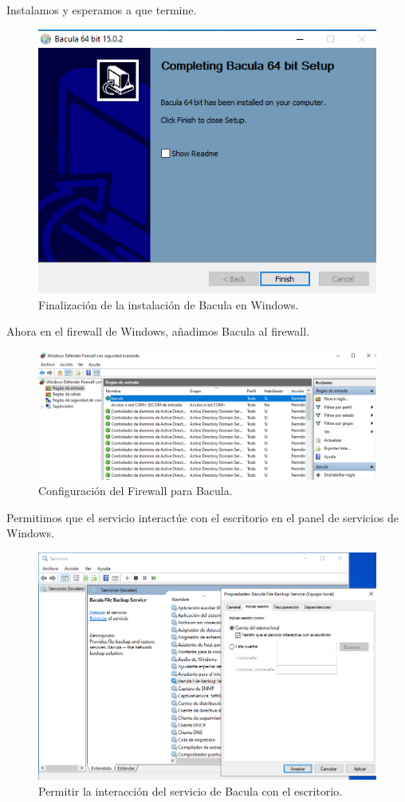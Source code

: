 Instalamos y esperamos a que termine.

\begin{figure}[H]
    \centering
    \includegraphics[width=0.5\linewidth]{instalacionBacula/teminadoInstalarBaculawin.png}
    \caption{Finalización de la instalación de Bacula en Windows.}
\end{figure}

Ahora en el firewall de Windows, añadimos Bacula al firewall.

\begin{figure}[H]
    \centering
    \includegraphics[width=0.5\linewidth]{instalacionBacula/firewallwindows.png}
    \caption{Configuración del Firewall para Bacula.}
\end{figure}

Permitimos que el servicio interactúe con el escritorio en el panel de servicios de Windows.

\begin{figure}[H]
    \centering
    \includegraphics[width=0.5\linewidth]{instalacionBacula/permitirservicio.png}
    \caption{Permitir la interacción del servicio de Bacula con el escritorio.}
\end{figure}
